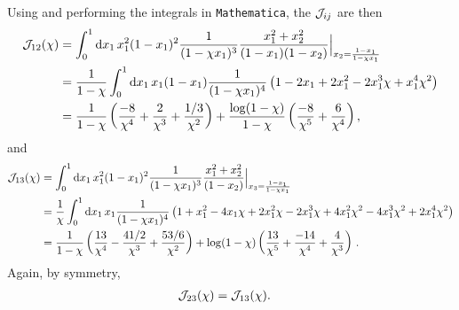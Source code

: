 Using  and performing the integrals in \texttt{Mathematica}, the \(\mathcal{J}_{ij}\) are then
\begin{align}
    \mathcal{J}_{12}(\chi)
    &=
    \int_0^1 \dd x_1\,
    x_1^2 (1 - x_1)^2
    \frac{1}{(1- \chi x_1)^3}
    \frac{x_1^2 + x_2^2}{(1-x_1)(1-x_2)}
    \Big|_{x_2 = \frac{1-x_1}{1-\chi x_1}}
    \\
    \notag
    &=
    \frac{1}{1-\chi}
    \int_0^1 \dd x_1\,
    x_1 (1 - x_1)
    \frac{1}{(1- \chi x_1)^4}
    \left(
        1 - 2 x_1 + 2 x_1^2 - 2 x_1^3 \chi + x_1^4 \chi^2
    \right)
    \\
    &=
   \frac{1}{1-\chi}
   \left(
    \frac{-8}{\chi^4} + \frac{2}{\chi^3} + \frac{1/3}{\chi^2}
   \right)
   +
   \frac{\log(1-\chi)}{1-\chi}
   \left(
    \frac{-8}{\chi^5} + \frac{6}{\chi^4}
   \right)
    ,
\end{align}
and
\begin{align}
    \mathcal{J}_{13}(\chi)
    &=
    \notag
    \int_0^1 \dd x_1\,
    x_1^2 (1 - x_1)^2
    \frac{1}{(1- \chi x_1)^3}
    \frac{x_1^2 + x_2^2}{(1-x_2)}
    \Big|_{x_3 = \frac{1-x_1}{1-\chi x_1}}
    \\
    \notag
    &=
    \frac{1}{\chi}
    \int_0^1 \dd x_1\,
    x_1
    \frac{1}{(1- \chi x_1)^4}
    \left(
        1 + x_1^2 - 4 x_1 \chi + 2 x_1^2 \chi - 2 x_1^3 \chi + 4 x_1^2 \chi^2 - 4 x_1^3 \chi^2 + 2 x_1^4 \chi^2
    \right)
    \\
    &=
    \frac{1}{1-\chi} \left(
        \frac{13}{\chi^4}
        -
        \frac{41/2}{\chi^3}
        +
        \frac{53/6}{\chi^2}
    \right)
    +
    \log(1-\chi)\left(
        \frac{13}{\chi^5}
        +
        \frac{-14}{\chi^4}
        +
        \frac{4}{\chi^3}
    \right)
    \,.
\end{align}
%
Again, by symmetry,
\begin{align}
    \mathcal{J}_{23}(\chi) &= \mathcal{J}_{13}(\chi).
\end{align}



